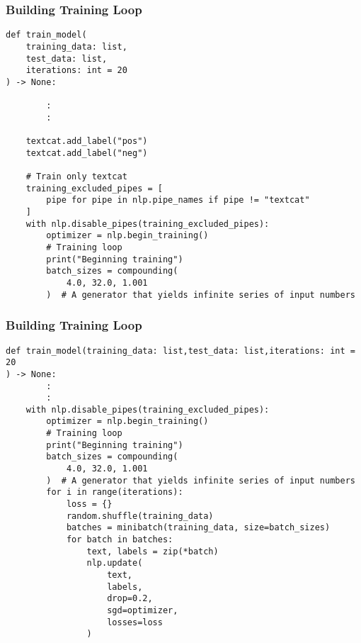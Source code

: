 \begin{frame}[fragile]\frametitle{Building Training Loop }

\begin{lstlisting}
def train_model(
    training_data: list,
    test_data: list,
    iterations: int = 20
) -> None:

		:
		:

    textcat.add_label("pos")
    textcat.add_label("neg")			
		
    # Train only textcat
    training_excluded_pipes = [
        pipe for pipe in nlp.pipe_names if pipe != "textcat"
    ]		
    with nlp.disable_pipes(training_excluded_pipes):
        optimizer = nlp.begin_training()
        # Training loop
        print("Beginning training")
        batch_sizes = compounding(
            4.0, 32.0, 1.001
        )  # A generator that yields infinite series of input numbers		
\end{lstlisting}

\end{frame}

\begin{frame}[fragile]\frametitle{Building Training Loop }

\begin{lstlisting}
def train_model(training_data: list,test_data: list,iterations: int = 20
) -> None:
		:
		:
    with nlp.disable_pipes(training_excluded_pipes):
        optimizer = nlp.begin_training()
        # Training loop
        print("Beginning training")
        batch_sizes = compounding(
            4.0, 32.0, 1.001
        )  # A generator that yields infinite series of input numbers		
        for i in range(iterations):
            loss = {}
            random.shuffle(training_data)
            batches = minibatch(training_data, size=batch_sizes)
            for batch in batches:
                text, labels = zip(*batch)
                nlp.update(
                    text,
                    labels,
                    drop=0.2,
                    sgd=optimizer,
                    losses=loss
                )				
\end{lstlisting}

\end{frame}


